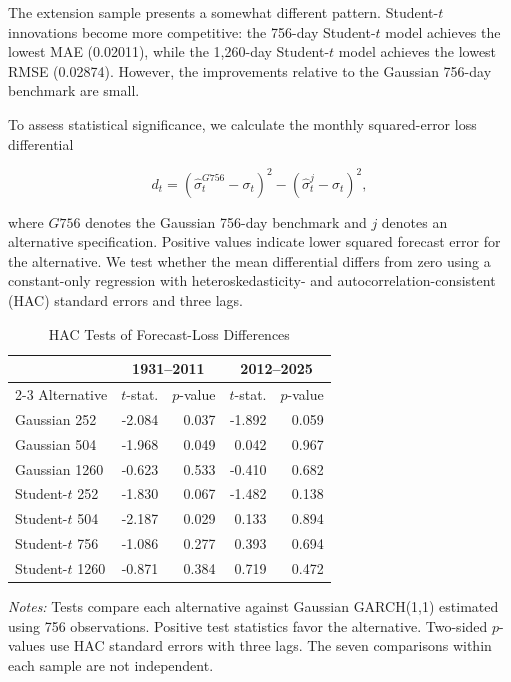 \documentclass[11pt]{article}
\begin{document}
The extension sample presents a somewhat different pattern.
Student-$t$ innovations become more competitive: the 756-day
Student-$t$ model achieves the lowest MAE (0.02011), while the
1,260-day Student-$t$ model achieves the lowest RMSE (0.02874).
However, the improvements relative to the Gaussian 756-day
benchmark are small.

To assess statistical significance, we calculate the monthly
squared-error loss differential

\begin{equation}
    d_t =
    \left(\widehat{\sigma}^{G756}_t-\sigma_t\right)^2
    -
    \left(\widehat{\sigma}^{j}_t-\sigma_t\right)^2,
\end{equation}

where $G756$ denotes the Gaussian 756-day benchmark and $j$
denotes an alternative specification. Positive values indicate
lower squared forecast error for the alternative. We test whether
the mean differential differs from zero using a constant-only
regression with heteroskedasticity- and autocorrelation-consistent
(HAC) standard errors and three lags.

\begin{table}[htbp]
\centering
\caption{HAC Tests of Forecast-Loss Differences}
\label{tab:garch_robustness_hac}
\small
\begin{tabular}{lrrrr}
\hline
& \multicolumn{2}{c}{1931--2011}
& \multicolumn{2}{c}{2012--2025} \\
\cline{2-3}\cline{4-5}
Alternative & $t$-stat. & $p$-value
            & $t$-stat. & $p$-value \\
\hline
Gaussian 252  & -2.084 & 0.037 & -1.892 & 0.059 \\
Gaussian 504  & -1.968 & 0.049 &  0.042 & 0.967 \\
Gaussian 1260 & -0.623 & 0.533 & -0.410 & 0.682 \\
Student-$t$ 252  & -1.830 & 0.067 & -1.482 & 0.138 \\
Student-$t$ 504  & -2.187 & 0.029 &  0.133 & 0.894 \\
Student-$t$ 756  & -1.086 & 0.277 &  0.393 & 0.694 \\
Student-$t$ 1260 & -0.871 & 0.384 &  0.719 & 0.472 \\
\hline
\end{tabular}
\begin{flushleft}
\footnotesize
\textit{Notes:} Tests compare each alternative against Gaussian
GARCH(1,1) estimated using 756 observations. Positive test
statistics favor the alternative. Two-sided $p$-values use
HAC standard errors with three lags. The seven comparisons
within each sample are not independent.
\end{flushleft}
\end{table}
\end{document}
